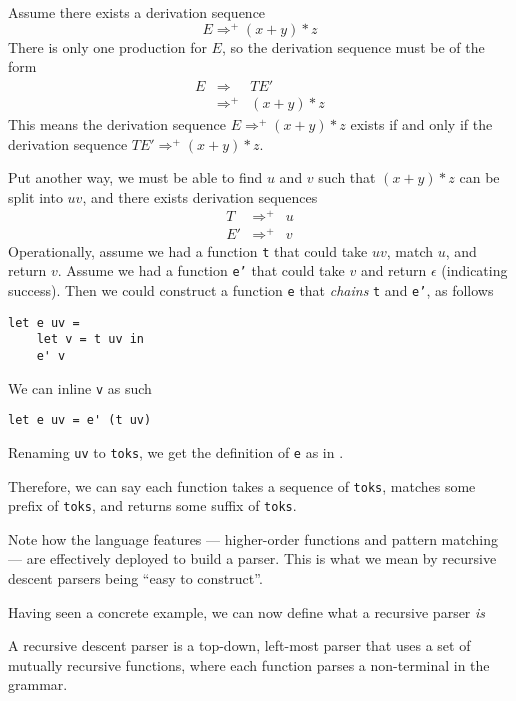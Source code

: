 Assume there exists a derivation sequence
\[E \Rightarrow^{+} (x+y) * z\]
There is only one production for $E$, so the derivation sequence must be of the form
\[
\begin{array}{rll}
E&\Rightarrow&TE'\\
&{\Rightarrow^{+}}&(x+y) * z
\end{array}
\]
This means the derivation sequence $E \Rightarrow^{+} (x+y) * z$ exists if and only if the derivation sequence $TE' \Rightarrow^{+} (x+y) * z$.

Put another way, we must be able to find $u$ and $v$ such that $(x + y) * z$ can be split into $uv$, and there exists derivation sequences
\[
\begin{array}{rcl}
T&{\Rightarrow^{+}}&u\\
{E'}&{\Rightarrow^{+}}&v
\end{array}
\]
Operationally, assume we had a function \texttt{t} that could take $uv$, match $u$, and return $v$. Assume we had a function \texttt{e'} that could take $v$ and return $\epsilon$ (indicating success). Then we could construct a function \texttt{e} that \textit{chains} \texttt{t} and \texttt{e'}, as follows
\begin{verbatim}
let e uv =
    let v = t uv in
    e' v
\end{verbatim}
We can inline \texttt{v} as such
\begin{verbatim}
let e uv = e' (t uv)
\end{verbatim}
Renaming \texttt{uv} to \texttt{toks}, we get the definition of \texttt{e} as in .

Therefore, we can say each function takes a sequence of \texttt{toks}, matches some prefix of \texttt{toks}, and returns some suffix of \texttt{toks}.

Note how the language features --- higher-order functions and pattern matching --- are effectively deployed to build a parser. This is what we mean by recursive descent parsers being ``easy to construct''.

Having seen a concrete example, we can now define what a recursive parser \textit{is}

\begin{definition}
    A recursive descent parser is a top-down, left-most parser that uses a set of mutually recursive functions, where each function parses a non-terminal in the grammar.
\end{definition}

